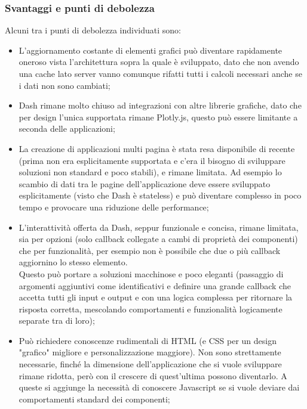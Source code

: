 \subsubsection{Svantaggi e punti di debolezza}
Alcuni tra i punti di debolezza individuati sono:
\begin{itemize}
\item L'aggiornamento costante di elementi grafici può diventare rapidamente oneroso vista l'architettura sopra la quale è sviluppato, dato che non avendo una cache lato server vanno comunque rifatti tutti i calcoli necessari anche se i dati non sono cambiati;

\item Dash rimane molto chiuso ad integrazioni con altre librerie grafiche, dato che per design l'unica supportata rimane Plotly.js, questo può essere limitante a seconda delle applicazioni;

\item La creazione di applicazioni multi pagina è stata resa disponibile di recente (prima non era esplicitamente supportata e c'era il bisogno di sviluppare soluzioni non standard e poco stabili), e rimane limitata. Ad esempio lo scambio di dati tra le pagine dell'applicazione deve essere sviluppato esplicitamente (visto che Dash è stateless) e può diventare complesso in poco tempo e provocare una riduzione delle performance;

\item L'interattività offerta da Dash, seppur funzionale e concisa, rimane limitata, sia per opzioni (solo callback collegate a cambi di proprietà dei componenti) che per funzionalità, per esempio non è possibile che due o più callback aggiornino lo stesso elemento. 
\\
Questo può portare a soluzioni macchinose e poco eleganti (passaggio di argomenti aggiuntivi come identificativi e definire una grande callback che accetta tutti gli input e output e con una logica complessa per ritornare la risposta corretta, mescolando comportamenti e funzionalità logicamente separate tra di loro);


\item Può richiedere conoscenze rudimentali di HTML (e CSS per un design "grafico" migliore e personalizzazione maggiore). Non sono strettamente necessarie, finché la dimensione dell'applicazione che si vuole sviluppare rimane ridotta, però con il crescere di quest'ultima possono diventarlo. A queste si aggiunge la necessità di conoscere Javascript se si vuole deviare dai comportamenti standard dei componenti;


\end{itemize}
